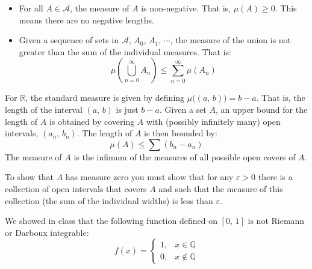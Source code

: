 \documentclass{article}
\theoremstyle{normal}
\begin{document}
        \begin{itemize}
            \item
                For all $A\in\mathcal{A}$, the measure of $A$ is non-negative.
                That is, $\mu(A)\geq{0}$. This means there are no negative
                lengths.
            \item
                Given a sequence of sets in $\mathcal{A}$, $A_{0}$, $A_{1}$,
                $\cdots$, the measure of the union is not greater than the
                sum of the individual measures. That is:
                \begin{equation}
                    \mu\left(\bigcup_{n=0}^{\infty}A_{n}\right)
                    \leq
                    \sum_{n=0}^{\infty}
                        \mu\left(A_{n}\right)
                \end{equation}
        \end{itemize}
        For $\mathbb{R}$, the standard measure is given by defining
        $\mu\big((a,\,b)\big)=b-a$. That is, the length of the interval
        $(a,\,b)$ is just $b-a$. Given a set $A$, an upper bound for the
        length of $A$ is obtained by covering $A$ with
        (possibly infinitely many) open intervals, $(a_{n},\,b_{n})$.
        The length of $A$ is then bounded by:
        \begin{equation}
            \mu(A)\leq\sum\left(b_{n}-a_{n}\right)
        \end{equation}
        The measure of $A$ is the infimum of the measures of all possible
        open covers of $A$.
        \par\hfill\par
        To show that $A$ has measure zero you must show that for any
        $\varepsilon>0$ there is a collection of open intervals that covers
        $A$ and such that the measure of this collection (the sum of the
        individual widths) is less than $\varepsilon$.
        \par\hfill\par
        We showed in class that the following function defined on $[0,\,1]$
        is not Riemann or Darboux integrable:
        \begin{equation}
            f(x)=
            \begin{cases}
                1,&x\in\mathbb{Q}\\
                0,&x\not\in\mathbb{Q}
            \end{cases}
        \end{equation}
\end{document}
